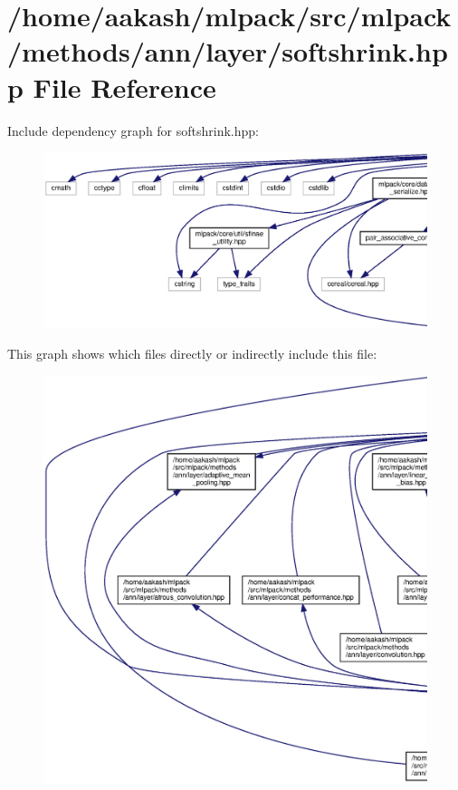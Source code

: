 \section{/home/aakash/mlpack/src/mlpack/methods/ann/layer/softshrink.hpp File Reference}
\label{softshrink_8hpp}
Include dependency graph for softshrink.\+hpp\+:
\nopagebreak
\begin{figure}[H]
\begin{center}
\leavevmode
\includegraphics[width=350pt]{softshrink_8hpp__incl}
\end{center}
\end{figure}
This graph shows which files directly or indirectly include this file\+:
\nopagebreak
\begin{figure}[H]
\begin{center}
\leavevmode
\includegraphics[width=350pt]{softshrink_8hpp__dep__incl}
\end{center}
\end{figure}
